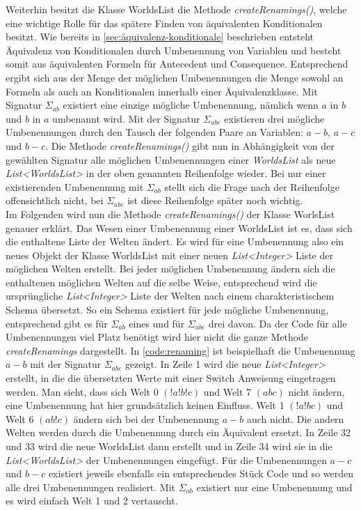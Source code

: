 \documentclass[12pt,a4paper]{article}
\begin{document}
Weiterhin besitzt die Klasse WorldsList die Methode \textit{createRenamings()}, welche eine wichtige Rolle für das spätere Finden von äquivalenten Konditionalen besitzt. Wie bereits in \autoref{sec:äquivalenz-konditionale} beschrieben entsteht Äquivalenz von Konditionalen durch Umbenennung von Variablen und besteht somit aus äquivalenten Formeln für Antecedent und Consequence. Entsprechend ergibt sich aus der Menge der möglichen Umbenennungen die Menge sowohl an Formeln als auch an Konditionalen innerhalb einer Äquivalenzklasse. Mit Signatur $\Sigma_{ab}$ existiert eine einzige mögliche Umbenennung, nämlich wenn $a$ in $b$ und $b$ in $a$ umbenannt wird. Mit der Signatur $\Sigma_{abc}$ existieren drei mögliche Umbenennungen durch den Tausch der folgenden Paare an Variablen: $a-b$, $a-c$ und $b-c$. Die Methode \textit{createRenamings()} gibt nun in Abhängigkeit von der gewählten Signatur alle möglichen Umbenennungen einer \textit {WorldsList} als neue \textit{List<WorldsList>} in der oben genannten Reihenfolge wieder. Bei nur einer existierenden Umbenennung mit $\Sigma_{ab}$ stellt sich die Frage nach der Reihenfolge offensichtlich nicht, bei $\Sigma_{abc}$ ist diese Reihenfolge später noch wichtig. \\
Im Folgenden wird nun die Methode \textit{createRenamings()} der Klasse WorlsList genauer erklärt. Das Wesen einer Umbenennung einer WorldsList ist es, dass sich die enthaltene Liste der Welten ändert. Es wird für eine Umbenennung also ein neues Objekt der Klasse WorldsList mit einer neuen \textit{List<Integer>} Liste der möglichen Welten erstellt. Bei jeder möglichen Umbenennung ändern sich die enthaltenen möglichen Welten auf die selbe Weise, entsprechend wird die ursprüngliche \textit{List<Integer>} Liste der Welten nach einem charakteristischem Schema \glqq übersetzt\grqq. So ein Schema existiert für jede mögliche Umbenennung, entsprechend gibt es für $\Sigma_{ab}$ eines und für $\Sigma_{abc}$ drei davon. Da der Code für alle Umbenennungen viel Platz benötigt wird hier nicht die ganze Methode \textit{createRenamings} dargestellt. In \autoref{code:renaming} ist beispielhaft die Umbenennung $a-b$ mit der Signatur $\Sigma_{abc}$ gezeigt. In Zeile 1 wird die neue \textit{List<Integer>} erstellt, in die die übersetzten Werte mit einer Switch Anweisung eingetragen werden. Man sieht, dass sich  Welt 0 $(!a!b!c)$ und Welt 7 $(abc)$ nicht ändern, eine Umbenennung hat hier grundsätzlich keinen Einfluss. Welt 1 $(!a!bc)$ und Welt 6 $(ab!c)$ ändern sich bei der Umbenennung $a-b$ auch nicht. Die andern Welten werden durch die Umbenennung durch ein Äquivalent ersetzt. In Zeile 32 und 33 wird die neue WorldsList dann erstellt und in Zeile 34 wird sie in die \textit{List<WorldsList>} der Umbenennungen eingefügt.  Für die Umbenennungen $a-c$ und $b-c$ existiert jeweils ebenfalls ein entsprechendes Stück Code und so werden alle drei Umbenennungen realisiert. Mit $\Sigma_{ab}$ existiert nur eine Umbenennung und es wird einfach Welt 1 und 2 vertauscht.
\end{document}
